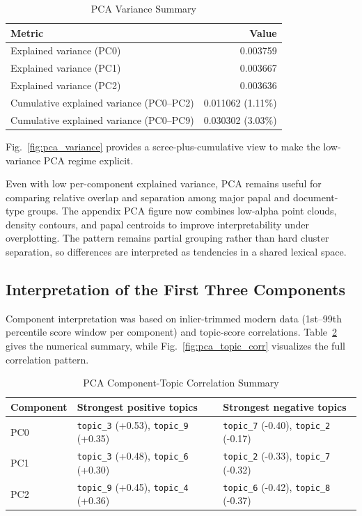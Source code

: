 \documentclass[conference]{IEEEtran}
\begin{document}
\begin{table}[htbp]
\caption{PCA Variance Summary}
\label{tab:pca_variance}
\centering
\begin{tabular}{lr}
\toprule
Metric & Value \\
\midrule
Explained variance (PC0) & 0.003759 \\
Explained variance (PC1) & 0.003667 \\
Explained variance (PC2) & 0.003636 \\
Cumulative explained variance (PC0--PC2) & 0.011062 (1.11\%) \\
Cumulative explained variance (PC0--PC9) & 0.030302 (3.03\%) \\
\bottomrule
\end{tabular}
\end{table}

Fig.~\ref{fig:pca_variance} provides a scree-plus-cumulative view to make the low-variance PCA regime explicit.

Even with low per-component explained variance, PCA remains useful for comparing relative overlap and separation among major papal and document-type groups. The appendix PCA figure now combines low-alpha point clouds, density contours, and papal centroids to improve interpretability under overplotting. The pattern remains partial grouping rather than hard cluster separation, so differences are interpreted as tendencies in a shared lexical space.

\subsection{Interpretation of the First Three Components}
Component interpretation was based on inlier-trimmed modern data (1st--99th percentile score window per component) and topic-score correlations. Table~\ref{tab:pca_corr_summary} gives the numerical summary, while Fig.~\ref{fig:pca_topic_corr} visualizes the full correlation pattern.

\begin{table}[htbp]
\caption{PCA Component-Topic Correlation Summary}
\label{tab:pca_corr_summary}
\centering
\footnotesize
\begin{tabular}{lp{}p{}}
\toprule
Component & Strongest positive topics & Strongest negative topics \\
\midrule
PC0 & \texttt{topic\_3} (+0.53), \texttt{topic\_9} (+0.35) & \texttt{topic\_7} (-0.40), \texttt{topic\_2} (-0.17) \\
PC1 & \texttt{topic\_3} (+0.48), \texttt{topic\_6} (+0.30) & \texttt{topic\_2} (-0.33), \texttt{topic\_7} (-0.32) \\
PC2 & \texttt{topic\_9} (+0.45), \texttt{topic\_4} (+0.36) & \texttt{topic\_6} (-0.42), \texttt{topic\_8} (-0.37) \\
\bottomrule
\end{tabular}
\end{table}
\end{document}
